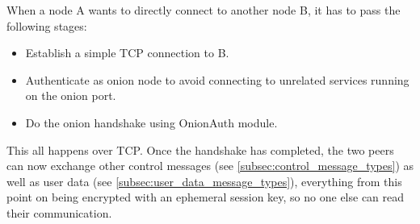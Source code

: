 \documentclass{article}
\begin{document}
When a node A wants to directly connect to another node B, it has to pass the following stages:
\begin{itemize}
	\item Establish a simple TCP connection to B.
	\item Authenticate as onion node to avoid connecting to unrelated services running on the onion port.
	\item Do the onion handshake using OnionAuth module.
\end{itemize}
This all happens over TCP. Once the handshake has completed, the two peers can now exchange other control messages (see \ref{subsec:control_message_types}) as well as user data (see \ref{subsec:user_data_message_types}), everything from this point on being encrypted with an ephemeral session key, so no one else can read their communication. 
\end{document}
